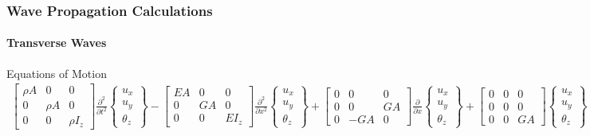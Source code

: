 \documentclass[aspectratio=169]{beamertmd}
\begin{document}
\begin{frame}[allowframebreaks]
  \frametitle{Wave Propagation Calculations}
  \framesubtitle{Transverse Waves}
  \begin{block}{Equations of Motion}
    {\tiny
      \begin{align*}
        \begin{bmatrix} \rho A & 0 & 0\\ 0 & \rho A & 0\\0 & 0 & \rho
          I_z \end{bmatrix} \frac{\partial^2}{\partial
                                                                 t^2}\begin{Bmatrix}
                                                                 u_x\\
                                                                 u_y\\\theta_z \end{Bmatrix}
        - \begin{bmatrix} EA & 0 & 0\\ 0 & GA & 0\\0 & 0 &
          EI_z \end{bmatrix} \frac{\partial^2}{\partial
                                                           x^2} \begin{Bmatrix}
                                                           u_x\\u_y\\\theta_z \end{Bmatrix}
        + \begin{bmatrix} 0 & 0 & 0\\ 0 & 0 & GA \\ 0 & -GA &
          0 \end{bmatrix} \frac{\partial}{\partial x}\begin{Bmatrix}
          u_x\\u_y\\\theta_z \end{Bmatrix} + \begin{bmatrix} 0 & 0 & 0
          \\ 0 & 0 & 0 \\ 0 & 0 & GA \end{bmatrix} \begin{Bmatrix}
          u_x\\ u_y\\\theta_z \end{Bmatrix} = \begin{Bmatrix} f_x\\

\end{Bmatrix}
\end{align*}}
\end{block}
\end{frame}
\end{document}
